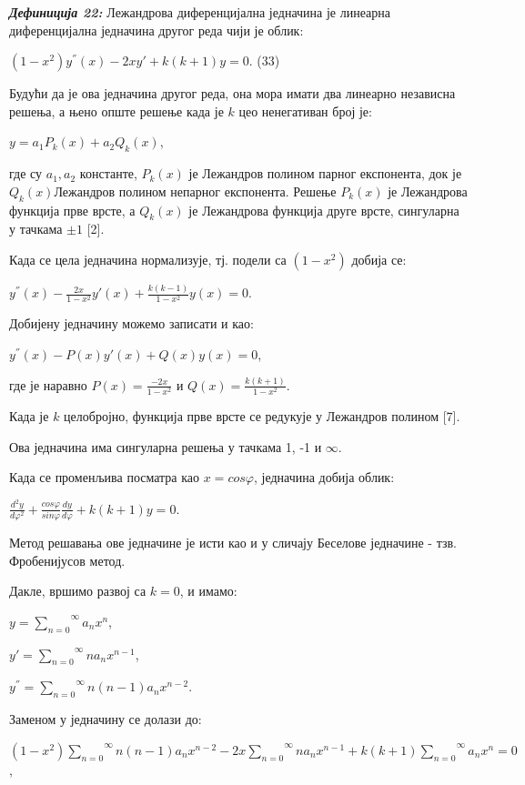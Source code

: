 \emph{\textbf{Дефиниција 22:}} Лежандрова диференцијална једначина је
линеарна диференцијална једначина другог реда чији је облик:

\((1 - x^{2})y^{''}(x) - 2xy' + k(k + 1)y = 0\). (33)

Будући да је ова једначина другог реда, она мора имати два линеарно
независна решења, а њено опште решење када је \(k\) цео ненегативан број
је:

\(y = a_{1}P_{k}(x) + a_{2}Q_{k}(x)\),

где су \(a_{1},a_{2}\) константе, \(P_{k}(x)\) је Лежандров полином
парног експонента, док је \(Q_{k}(x)\)Лежандров полином непарног
експонента. Решење \(P_{k}(x)\) је Лежандрова функција прве врсте, а
\(Q_{k}(x)\) је Лежандрова функција друге врсте, сингуларна у тачкама
\(\pm 1\) {[}2{]}.

Када се цела једначина нормализује, тј. подели са \((1 - x^{2})\) добија
се:

\(y^{''}(x) - \frac{2x}{1 - x^{2}}y'(x) + \frac{k(k - 1)}{1 - x^{2}}y(x) = 0\).

Добијену једначину можемо записати и као:

\(y^{''}(x) - P(x)y'(x) + Q(x)y(x) = 0\),

где је наравно \(P(x) = \frac{- 2x}{1 - x^{2}}\) и
\(Q(x) = \frac{k(k + 1)}{1 - x^{2}}\).

Када је \(k\) целобројно, функција прве врсте се редукује у Лежандров
полином {[}7{]}.

Ова једначина има сингуларна решења у тачкама 1, -1 и \(\infty\).

Када се променљива посматра као \(x = cos\varphi\), једначина добија
облик:

\(\frac{d^{2}y}{d\varphi^{2}} + \frac{cos\varphi}{sin\varphi}\frac{dy}{d\varphi} + k(k + 1)y = 0\).

Метод решавања ове једначине је исти као и у сличају Беселове једначине
- тзв. Фробенијусов метод.

Дакле, вршимо развој са \(k = 0\), и имамо:

\(y = \overset{\infty}{\sum_{n = 0}}a_{n}x^{n}\),

\(y' = \overset{\infty}{\sum_{n = 0}}na_{n}x^{n - 1}\),

\(y^{''} = \overset{\infty}{\sum_{n = 0}}n(n - 1)a_{n}x^{n - 2}\).

Заменом у једначину се долази до:

\((1 - x^{2})\overset{\infty}{\sum_{n = 0}}n(n - 1)a_{n}x^{n - 2} - 2x\overset{\infty}{\sum_{n = 0}}na_{n}x^{n - 1} + k(k + 1)\overset{\infty}{\sum_{n = 0}}a_{n}x^{n} = 0\),

